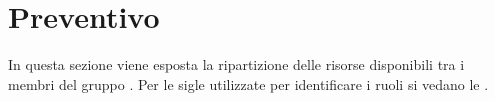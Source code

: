 \section{Preventivo}
In questa sezione viene esposta la ripartizione delle risorse disponibili tra i membri del gruppo \Gruppo{}. Per le sigle utilizzate per identificare i ruoli si vedano le \NdPv{}.




